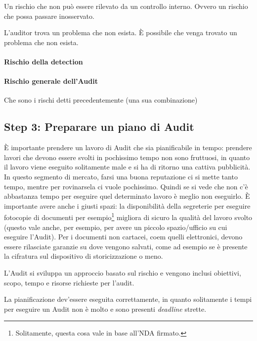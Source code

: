 Un rischio che non può essere rilevato da un controllo interno. Ovvero un 
rischio che possa passare inosservato.

L'auditor trova un problema che non esista. È possibile che venga trovato un 
problema che non esista.


\paragraph*{Rischio della detection}



\paragraph*{Rischio generale dell'Audit}

Che sono i rischi detti precedentemente (una sua combinazione)



\subsection{Step 3: Preparare un piano di Audit}

È importante prendere un lavoro di Audit che sia pianificabile in tempo: 
prendere lavori che devono essere svolti in pochissimo tempo non sono fruttuosi, 
in quanto il lavoro viene eseguito solitamente male e si ha di ritorno una 
cattiva pubblicità. In questo segmento di mercato, farsi una buona reputazione 
ci si mette tanto tempo, mentre per rovinarsela ci vuole pochissimo. Quindi se 
si vede che non c'è abbastanza tempo per eseguire quel determinato lavoro è 
meglio non eseguirlo. 
È importante avere anche i giusti spazi: la disponibilità della segreterie per 
eseguire fotocopie di documenti per esempio\footnote{Solitamente, questa cosa 
vale in base all'NDA firmato.} migliora di sicuro la qualità del lavoro svolto 
(questo vale anche, per esempio, per avere un piccolo spazio/ufficio su cui 
eseguire l'Audit). Per i documenti non cartacei, coem quelli elettronici, devono 
essere rilasciate garanzie su dove vengono salvati, come ad esempio se è 
presente la cifratura sul dispositivo di storicizzazione o meno.

L'Audit si sviluppa un approccio basato sul rischio e vengono inclusi obiettivi, 
scopo, tempo e risorse richieste per l'audit.

La pianificazione dev'essere eseguita correttamente, in quanto solitamente i 
tempi per eseguire un Audit non è molto e sono presenti \textit{deadline} 
strette.




